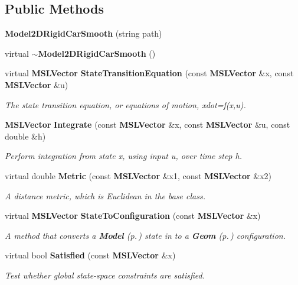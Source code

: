 \subsection*{Public Methods}
\begin{CompactItemize}
\item 
{\bf Model2DRigid\-Car\-Smooth} (string path)
\item 
virtual {\bf $\sim$Model2DRigid\-Car\-Smooth} ()
\item 
virtual {\bf MSLVector} {\bf State\-Transition\-Equation} (const {\bf MSLVector} \&x, const {\bf MSLVector} \&u)
\begin{CompactList}\small\item\em The state transition equation, or equations of motion, xdot=f(x,u).\item\end{CompactList}\item 
{\bf MSLVector} {\bf Integrate} (const {\bf MSLVector} \&x, const {\bf MSLVector} \&u, const double \&h)
\begin{CompactList}\small\item\em Perform integration from state x, using input u, over time step h.\item\end{CompactList}\item 
virtual double {\bf Metric} (const {\bf MSLVector} \&x1, const {\bf MSLVector} \&x2)
\begin{CompactList}\small\item\em A distance metric, which is Euclidean in the base class.\item\end{CompactList}\item 
virtual {\bf MSLVector} {\bf State\-To\-Configuration} (const {\bf MSLVector} \&x)
\begin{CompactList}\small\item\em A method that converts a {\bf Model} {\rm (p.\,\pageref{classModel})} state in to a {\bf Geom} {\rm (p.\,\pageref{classGeom})} configuration.\item\end{CompactList}\item 
virtual bool {\bf Satisfied} (const {\bf MSLVector} \&x)
\begin{CompactList}\small\item\em Test whether global state-space constraints are satisfied.\item\end{CompactList}\end{CompactItemize}
